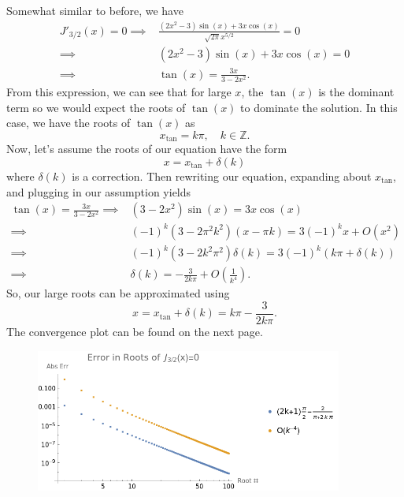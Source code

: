 \documentclass[a4paper,12pt]{article}
\newcommand{\ints}{\mathbb{Z}}
\begin{document}
\begin{enumerate}[label = \arabic*)]
\begin{enumerate}[label = (\alph*)]
		Somewhat similar to before, we have
		\begin{align*}
			J'_{3/2}(x) = 0 \implies & \frac{\left(2 x^2-3\right) \sin (x)+3 x \cos (x)}{\sqrt{2 \pi } x^{5/2}} = 0 \\
			\implies & \left(2 x^2-3\right) \sin (x)+3 x \cos (x) = 0 \\
			\implies & \tan(x) = \frac{3x}{3 - 2x^2}.
		\end{align*}
		From this expression, we can see that for large $ x $, the $ \tan(x) $ is the dominant term so we would expect the roots of $ \tan(x) $ to dominate the solution. In this case, we have the roots of $ \tan(x) $ as
		\[
		x_{\tan} = k \pi, \quad k \in \ints.
		\]
		Now, let's assume the roots of our equation have the form
		\[
			x = x_{\tan} + \delta(k)
		\]
		where $ \delta(k) $ is a correction. Then rewriting our equation, expanding about $ x_{\tan} $, and plugging in our assumption yields
		\begin{align*}
			\tan(x) = \frac{3x}{3 - 2x^2} \implies & \left(3 - 2 x^2\right) \sin (x) = 3 x \cos (x) \\
			\implies & (-1)^k \left(3-2 \pi ^2 k^2\right) (x-\pi  k) = 3 (-1)^k x + O(x^2) \\
			\implies & (-1)^k(3 - 2k^2 \pi^2)\delta(k) = 3(-1)^k (k \pi + \delta(k)) \\
			\implies & \delta(k) = -\frac{3}{2 k \pi} + O\left(\frac{1}{k^4}\right).
		\end{align*}
		So, our large roots can be approximated using
		\[
			\boxed{x = x_{\tan} + \delta(k) = k\pi - \frac{3}{2 k \pi}.}
		\]
		The convergence plot can be found on the next page.
		
		\newpage
		\begin{figure}[ht]
			\centering
			\includegraphics[width = 0.9\textwidth]{Images/4a.png}
		\end{figure}
		

\end{enumerate}
\end{enumerate}
\end{document}
